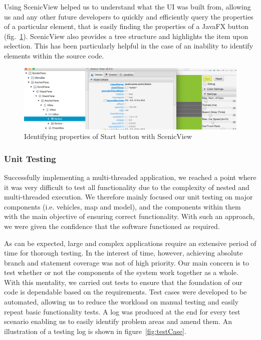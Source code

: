 Using ScenicView helped us to understand what the UI was built from, allowing us and any other future developers to quickly and efficiently query the properties of a particular element, that is easily finding the properties of a JavaFX button (fig.~\ref{fig:scenicview}). ScenicView also provides a tree structure and highlights the item upon selection. This has been particularly helpful in the case of an inability to identify elements within the source code.  
\begin{figure}[h]
	\begin{center}
		\includegraphics[width=\textwidth]{img/scenicView.png}
		\caption[Identifying properties of Start button with ScenicView]{Identifying properties of Start button with ScenicView}
	\label{fig:scenicview}
	\end{center}
\end{figure}

\subsubsection*{Unit Testing}
Successfully implementing a multi-threaded application, we reached a point where it was very difficult to test all functionality due to the complexity of nested and multi-threaded execution. We therefore mainly focused our unit testing on major components (i.e. vehicles, map and model), and the components within them with the main objective of ensuring correct functionality. With such an approach, we were given the confidence that the software functioned as required.

As can be expected, large and complex applications require an extensive period of time for thorough testing. In the interest of time, however, achieving absolute branch and statement coverage was not of high priority. Our main concern is to test whether or not the components of the system work together as a whole.  With this mentality, we carried out tests to ensure that the foundation of our code is dependable based on the requirements. Test cases were developed to be automated, allowing us to reduce the workload on manual testing and easily repeat basic functionality tests. A log was produced at the end for every test scenario enabling us to easily identify problem areas and amend them. An illustration of a testing log is shown in figure~\ref{fig:testCase}. 


